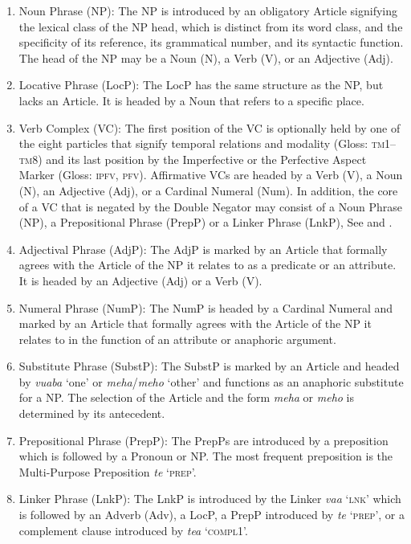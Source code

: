 \documentclass[output=paper]{langscibook}
\begin{document}
\begin{enumerate}
    \item Noun Phrase (NP): The NP is introduced by an obligatory Article signifying the lexical class of the NP head, which is distinct from its word class, and the specificity of its reference, its grammatical number, and its syntactic function. The head of the NP may be a Noun (N), a Verb (V), or an Adjective (Adj).
    \item Locative Phrase (LocP): The LocP has the same structure as the NP, but lacks an Article. It is headed by a Noun that refers to a specific place.
    \item Verb Complex (VC): The first position of the VC is optionally held by one of the eight particles that signify temporal relations and modality (Gloss: \textsc{tm}1--\textsc{tm}8) and its last position by the Imperfective or the Perfective Aspect Marker (Gloss: \textsc{ipfv}, \textsc{pfv}). Affirmative VCs are headed by a Verb (V), a Noun (N), an Adjective (Adj), or a Cardinal Numeral (Num). In addition, the core of a VC that is negated by the Double Negator may consist of a Noun Phrase (NP), a Prepositional Phrase (PrepP) or a Linker Phrase (LnkP), See  and .
    \item Adjectival Phrase (AdjP): The AdjP is marked by an Article that formally agrees with the Article of the NP it relates to as a predicate or an attribute. It is headed by an Adjective (Adj) or a Verb (V).
    \item Numeral Phrase (NumP): The NumP is headed by a Cardinal Numeral and marked by an Article that formally agrees with the Article of the NP it relates to in the function of an attribute or anaphoric argument.
    \item Substitute Phrase (SubstP): The SubstP is marked by an Article and headed by \textit{vuaba} `one' or \textit{meha}/\textit{meho} `other' and functions as an anaphoric substitute for a NP. The selection of the Article and the form \textit{meha} or \textit{meho} is determined by its antecedent. 
    \item Prepositional Phrase (PrepP): The PrepPs are introduced by a preposition which is followed by a Pronoun or NP. The most frequent preposition is the Multi-Purpose Preposition \textit{te} `\textsc{prep}'.
    \item Linker Phrase (LnkP): The LnkP is introduced by the Linker \textit{vaa} `\textsc{lnk}' which is followed by an Adverb (Adv), a LocP, a PrepP introduced by \textit{te} `\textsc{prep}', or a complement clause introduced by \textit{tea} `\textsc{compl}1'.
\end{enumerate}
\end{document}
